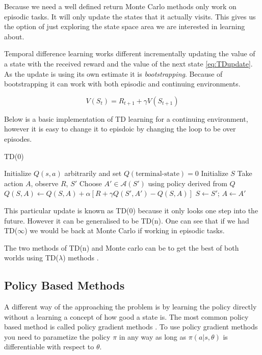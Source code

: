 Because we need a well defined return Monte Carlo methods only work on episodic tasks. It will only update the states that it actually visits. This gives us the option of just exploring the state space area we are interested in learning about.

Temporal difference learning works different incrementally updating the value of a state with the received reward and the value of the next state \ref{eq:TDupdate}. As the update is using its own estimate it is \textit{bootstrapping}. Because of bootstrapping it can work with both episodic and continuing environments.

\begin{equation}
V(S_{t})=R_{t+1}+\gamma V(S_{t+1})
\label{eq:TDupdate}
\end{equation}

Below is a basic implementation of TD learning for a continuing environment, however it is easy to change it to episdoic by changing the loop to be over episodes.

\begin{algorithm}
\caption{TD(0)}
\begin{algorithmic}[1]
\State Initialize $Q(s,a)$ arbitrarily and set $Q(\text{terminal-state}) = 0$
\State Initialize $S$
    \State Take action $A$, observe $R$, $S'$
    \State Choose $A' \in \mathcal{A}(S')$ using policy derived from $Q$
    \State $Q(S,A) \gets Q(S,A) + \alpha \left[ R + \gamma Q(S', A') - Q(S,A) \right]$
    \State $S \gets S'$; $A \gets A'$
\EndWhile
\end{algorithmic}
\end{algorithm}

This particular update is known as TD(0) because it only looks one step into the future. However it can be generalised to be TD(n). One can see that if we had TD($\infty$) we would be back at Monte Carlo if working in episodic tasks.

The two methods of TD(n) and Monte carlo can be to get the best of both worlds using TD($\lambda$) methods \cite{suttonLearningPredictMethods1988}.


\subsection{Policy Based Methods}

A different way of the approaching the problem is by learning the policy directly without a learning a concept of how good a state is. The most common policy based method is called policy gradient methods \cite{suttonPolicyGradientMethods1999}. To use policy gradient methods you need to parametize the policy $\pi$ in any way as long as $\pi(a|s, \theta)$ is differentiable with respect to $\theta$.

